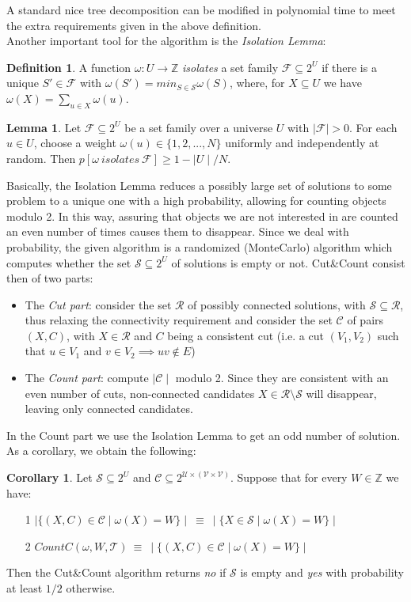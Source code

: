 \documentclass{article}
\theoremstyle{definition}
\newtheorem{definition}{Definition}[section]
\theoremstyle{lemma}
\newtheorem{lemma}{Lemma}[section]
\theoremstyle{corollary}
\newtheorem{corollary}{Corollary}[section]
\theoremstyle{theorem}
\begin{document}
A standard nice tree decomposition can be modified in polynomial time to meet the extra requirements given in the above definition. \\
Another important tool for the algorithm is the \emph{Isolation Lemma}:
\theoremstyle{definition}
\begin{definition}
	A function $\omega : U \rightarrow \mathbb{Z}$ \emph{isolates} a set family 
	$\mathcal{F} \subseteq 2^U$ if there is a unique $S' \in \mathcal{F}$ with
	$\omega(S') = min_{S \in \mathcal{S}} \omega(S)$, where, for $X \subseteq U$ we have
	$\omega(X) = \sum_{u \in X} \omega(u)$.
\end{definition}
\begin{lemma}
	Let $\mathcal{F} \subseteq 2^U$ be a set family over a universe $U$ with 
	$\mid \mathcal{F} \mid > 0$. For each $u \in U$, choose a weight 
	$\omega(u) \in \{1,2,...,N \}$ uniformly and independently at random. Then 
	$p[\omega \ isolates \ \mathcal{F}] \geq 1-\mid U \mid / N$.
\end{lemma}
Basically, the Isolation Lemma reduces a possibly large set of solutions to some problem to a unique one with a high probability, allowing for counting objects modulo 2. In this way, assuring that objects we are not interested in are counted an even number of times causes them to disappear. Since we deal with probability, the given algorithm is a randomized (MonteCarlo) algorithm which computes whether the set $\mathcal{S} \subseteq 2^U$ of solutions is empty or 
not. Cut\&Count consist then of two parts:
\begin{itemize}
	\item The \emph{Cut part}: consider the set $\mathcal{R}$ of possibly connected solutions,
	with $\mathcal{S} \subseteq \mathcal{R}$, thus relaxing the connectivity requirement and
	consider the set $\mathcal{C}$ of pairs $(X,C)$, with $X \in \mathcal{R}$ and $C$ being a
	consistent cut (i.e. a cut $(V_1,V_2)$ such that $u \in V_1$ and 
	$v \in V_2 \implies uv \not \in E$)
	\item The \emph{Count part}: compute $\mid \mathcal{C} \mid$ modulo 2. Since they are
	consistent with an even number of cuts, non-connected candidates 
	$X \in \mathcal{R} \setminus \mathcal{S}$ will disappear, leaving only connected candidates.
\end{itemize}
In the Count part we use the Isolation Lemma to get an odd number of solution. As a corollary, we obtain the following:
\begin{corollary}\label{cor}
	Let $\mathcal{S} \subseteq 2^U$ and $\mathcal{C \subseteq 2^{U \times (V \times V)}}$.
	Suppose that for every $W \in \mathbb{Z}$ we have:
	\begin{itemize}
		\item[1] $\mid \{ (X,C) \in \mathcal{C} \mid \omega(X) = W \} \mid \ \equiv \ 
		\mid \{ X \in \mathcal{S} \mid \omega(X) = W\} \mid$
		\item[2] $CountC(\omega,W,\mathcal{T}) \ \equiv \
		\mid \{ (X,C) \in \mathcal{C} \mid \omega(X) = W \} \mid$
	\end{itemize}
	Then the Cut\&Count algorithm returns \emph{no} if $\mathcal{S}$ is empty and \emph{yes}
	with probability at least $1/2$ otherwise.
\end{corollary}
\end{document}
